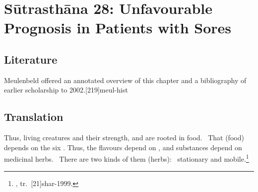\chapter{Sūtrasthāna 28: Unfavourable Prognosis in Patients 
with Sores}

\section{Literature}

Meulenbeld offered an annotated overview of this chapter and a bibliography
of earlier scholarship to 2002.[219]{meul-hist} 

\section{Translation}
    
\begin{translation}    
    \item [1] Thus, living creatures and their strength,
 and  are rooted in food.  That
(food) depends on the six . Thus, the flavours depend
on , and substances depend on medicinal herbs. 
There are two kinds of them (herbs):  stationary and 
mobile.\footnote{, tr.\ [21]{shar-1999}.}

\end{translation}